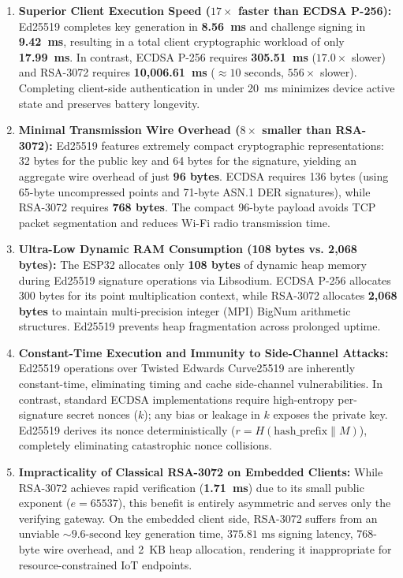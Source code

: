 \documentclass[11pt,a4paper]{article}
\begin{document}
\begin{enumerate}
    \item \textbf{Superior Client Execution Speed ($17\times$ faster than ECDSA P-256):}  
    Ed25519 completes key generation in \textbf{8.56~ms} and challenge signing in \textbf{9.42~ms}, resulting in a total client cryptographic workload of only \textbf{17.99~ms}. In contrast, ECDSA P-256 requires \textbf{305.51~ms} ($17.0\times$ slower) and RSA-3072 requires \textbf{10,006.61~ms} ($\approx 10\text{ seconds}$, $556\times$ slower). Completing client-side authentication in under 20~ms minimizes device active state and preserves battery longevity.

    \item \textbf{Minimal Transmission Wire Overhead ($8\times$ smaller than RSA-3072):}  
    Ed25519 features extremely compact cryptographic representations: 32 bytes for the public key and 64 bytes for the signature, yielding an aggregate wire overhead of just \textbf{96 bytes}. ECDSA requires 136 bytes (using 65-byte uncompressed points and 71-byte ASN.1 DER signatures), while RSA-3072 requires \textbf{768 bytes}. The compact 96-byte payload avoids TCP packet segmentation and reduces Wi-Fi radio transmission time.

    \item \textbf{Ultra-Low Dynamic RAM Consumption (108 bytes vs. 2,068 bytes):}  
    The ESP32 allocates only \textbf{108 bytes} of dynamic heap memory during Ed25519 signature operations via Libsodium. ECDSA P-256 allocates 300 bytes for its point multiplication context, while RSA-3072 allocates \textbf{2,068 bytes} to maintain multi-precision integer (MPI) BigNum arithmetic structures. Ed25519 prevents heap fragmentation across prolonged uptime.

    \item \textbf{Constant-Time Execution and Immunity to Side-Channel Attacks:}  
    Ed25519 operations over Twisted Edwards Curve25519 are inherently constant-time, eliminating timing and cache side-channel vulnerabilities. In contrast, standard ECDSA implementations require high-entropy per-signature secret nonces ($k$); any bias or leakage in $k$ exposes the private key. Ed25519 derives its nonce deterministically ($r = H(\text{hash\_prefix} \parallel M)$), completely eliminating catastrophic nonce collisions.

    \item \textbf{Impracticality of Classical RSA-3072 on Embedded Clients:}  
    While RSA-3072 achieves rapid verification (\textbf{1.71~ms}) due to its small public exponent ($e = 65537$), this benefit is entirely asymmetric and serves only the verifying gateway. On the embedded client side, RSA-3072 suffers from an unviable $\sim 9.6\text{-second}$ key generation time, $375.81\text{ ms}$ signing latency, 768-byte wire overhead, and 2~KB heap allocation, rendering it inappropriate for resource-constrained IoT endpoints.
\end{enumerate}
\end{document}
